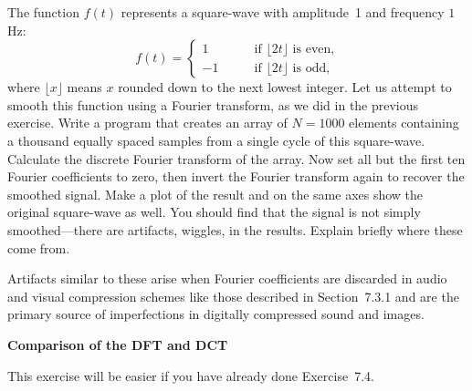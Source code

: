 \documentclass[12pt]{article}
\begin{document}
\begin{exercises}
\exskip The function $f(t)$ represents a square-wave with amplitude~1 and
frequency $1\,$Hz:
\begin{equation}
f(t) = \left\lbrace\begin{array}{rl}
          1  & \qquad\mbox{if $\lfloor 2t \rfloor$ is even,} \\
         -1  & \qquad\mbox{if $\lfloor 2t \rfloor$ is odd,}
       \end{array}\right.
\end{equation}
where $\lfloor x\rfloor$ means $x$ rounded down to the next lowest integer.
Let us attempt to smooth this function using a Fourier transform, as we did
in the previous exercise.  Write a program that creates an array of
$N=1000$ elements containing a thousand equally spaced samples from a
single cycle of this square-wave.  Calculate the discrete Fourier transform
of the array.  Now set all but the first ten Fourier coefficients to zero,
then invert the Fourier transform again to recover the smoothed signal.
Make a plot of the result and on the same axes show the original
square-wave as well.  You should find that the signal is not simply
smoothed---there are artifacts, wiggles, in the results.  Explain
briefly where these come from.

Artifacts similar to these arise when Fourier coefficients are discarded in
audio and visual compression schemes like those described in Section~7.3.1
and are the primary source of imperfections in digitally compressed sound
and images.



\exercise \textbf{Comparison of the DFT and DCT}

\exskip This exercise will be easier if you have already done Exercise~7.4.


\end{exercises}
\end{document}
